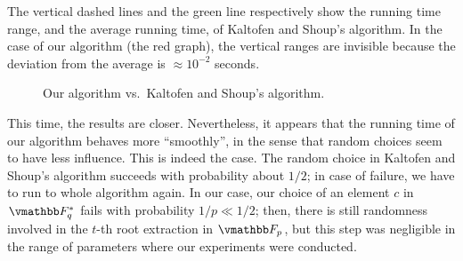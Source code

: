 The vertical dashed lines and the green line respectively show the
running time range, and the average running time, of Kaltofen and
Shoup's algorithm. In the case of our algorithm (the red graph), the
vertical ranges are invisible because the deviation from the average
is $\approx 10^{-2}$ seconds. 



\begin{figure}[ht]
\setlength{\abovecaptionskip}{0cm}
\begin{flushleft}
\end{flushleft}
\caption{\small Our algorithm vs.\ Kaltofen and Shoup's algorithm.}
\label{figure:sqrtTimingKvN}
\end{figure}

This time, the results are closer.
Nevertheless, it appears that the running time of our algorithm
behaves more ``smoothly'', in the sense that random choices seem to
have less influence. This is indeed the case. The random choice in
Kaltofen and Shoup's algorithm succeeds with probability about $1/2$;
in case of failure, we have to run to whole algorithm again. In our
case, our choice of an element $c$ in $\F_q^*$ fails with probability
$1/p \ll 1/2$; then, there is still randomness involved in the $t$-th
root extraction in $\F_p$, but this step was negligible in the range
of parameters where our experiments were conducted.

